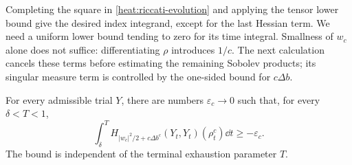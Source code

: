 Completing the square in \eqref{heat:riccati-evolution} and applying
the tensor lower bound give the desired index integrand, except for
the last Hessian term. We need a uniform lower bound tending to
zero for its time integral. Smallness of \(w_c\) alone does not suffice:
differentiating \(\rho\) introduces \(1/c\). The next calculation
cancels these terms before estimating the remaining Sobolev products;
its singular measure term is controlled by the one-sided bound for
\(c\Delta b\).

\begin{lemma}
\label{heat:error-cancellation}
For every admissible trial \(Y\), there are numbers
\(\varepsilon_c\to0\) such that, for every
\(\delta<T<1\),
\begin{equation}
\label{heat:error-lower-bound}
\int_\delta^T
H_{|w_c|^2/2+c\Delta b^c}(Y_t,Y_t)(\rho_t^c)\dd t
\ge-\varepsilon_c.
\end{equation}
The bound is independent of the terminal exhaustion parameter
\(T\).
\end{lemma}

